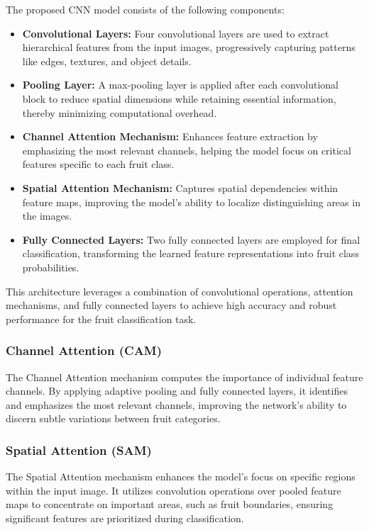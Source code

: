 \documentclass{article}
\begin{document}
The proposed CNN model consists of the following components:

\begin{itemize}
    \item \textbf{Convolutional Layers:} Four convolutional layers are used to extract hierarchical features from the input images, progressively capturing patterns like edges, textures, and object details.
    \item \textbf{Pooling Layer:} A max-pooling layer is applied after each convolutional block to reduce spatial dimensions while retaining essential information, thereby minimizing computational overhead.
    \item \textbf{Channel Attention Mechanism:} Enhances feature extraction by emphasizing the most relevant channels, helping the model focus on critical features specific to each fruit class.
    \item \textbf{Spatial Attention Mechanism:} Captures spatial dependencies within feature maps, improving the model's ability to localize distinguishing areas in the images.
    \item \textbf{Fully Connected Layers:} Two fully connected layers are employed for final classification, transforming the learned feature representations into fruit class probabilities.
\end{itemize}

This architecture leverages a combination of convolutional operations, attention mechanisms, and fully connected layers to achieve high accuracy and robust performance for the fruit classification task.

\subsubsection{Channel Attention (CAM)}
The Channel Attention mechanism computes the importance of individual feature channels. By applying adaptive pooling and fully connected layers, it identifies and emphasizes the most relevant channels, improving the network's ability to discern subtle variations between fruit categories.

\subsubsection{Spatial Attention (SAM)}
The Spatial Attention mechanism enhances the model's focus on specific regions within the input image. It utilizes convolution operations over pooled feature maps to concentrate on important areas, such as fruit boundaries, ensuring significant features are prioritized during classification.
\end{document}
